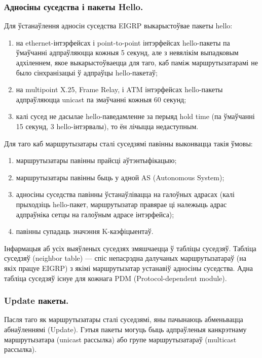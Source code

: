 \subsubsection{Адносіны суседства і пакеты Hello.}

Для ўстанаўлення адносін суседства EIGRP выкарыстоўвае пакеты hello:
\begin{enumerate}
    \item на ethernet-інтэрфейсах і point-to-point інтэрфейсах hello-пакеты па ўмаўчанні адпраўляюцца кожныя 5 секунд, але з невялікім выпадковым адхіленнем, якое выкарыстоўваецца для таго, каб паміж маршрутызатарамі не было сінхранізацыі ў адпраўцы hello-пакетаў;
    \item на multipoint X.25, Frame Relay, і ATM інтэрфейсах hello-пакеты адпраўляюцца unicast па змаўчанні кожныя 60 секунд;
    \item калі сусед не дасылае hello-паведамленне за перыяд hold time (па ўмаўчанні 15 секунд, 3 hello-інтэрвалы), то ён лічыцца недаступным.
\end{enumerate}

Для таго каб маршрутызатары сталі суседзямі павінны выконвацца такія ўмовы:
\begin{enumerate}
    \item маршрутызатары павінны прайсці аўтэнтыфікацыю;
    \item маршрутызатары павінны быць у адной AS (Autonomous System);
    \item адносіны суседства павінны ўстанаўлівацца на галоўных адрасах (калі прыходзіць hello-пакет, маршрутызатар правярае ці належыць адрас адпраўніка сетцы на галоўным адрасе інтэрфейса);
    \item павінны супадаць значэння K-каэфіцыентаў.
\end{enumerate}

Інфармацыя аб усіх выяўленых суседзях змяшчаецца ў табліцы суседзяў.
Табліца суседзяў (neighbor table) --- спіс непасрэдна далучаных маршрутызатараў (на якіх працуе EIGRP) з якімі маршрутызатар устанавіў адносіны суседства. Адна табліца суседзяў існуе для кожнага PDM (Protocol-dependent module).

\subsubsection{Update пакеты.}

Пасля таго як маршрутызатары сталі суседзямі, яны пачынаюць абменьвацца абнаўленнямі (Update). Гэтыя пакеты могуць быць адпраўленыя канкрэтнаму маршрутызатара (unicast рассылка) або групе маршрутызатараў (multicast рассылка).

